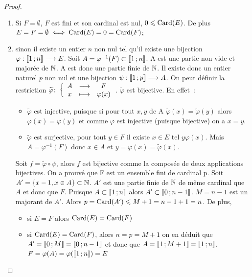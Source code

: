 \begin{proof}
  \begin{enumerate}
    \item Si \(F = \emptyset\), \(F\) est fini et son cardinal est nul, 
      \(0\leqslant\operatorname{Card}(E)\). De plus \(E = F = \emptyset \iff \operatorname{Card}(E) = 0 
      = \operatorname{Card}(F)\);
    \item sinon il existe un entier \(n\) non nul tel qu'il existe une 
      bijection \(\varphi:\mathopen{\llbracket}1\mathclose{}\mathpunct{};n\mathclose{\rrbracket} \longrightarrow E\). Soit 
      \(A = \varphi^{-1}(F) \subset\mathopen{\llbracket}1\mathclose{}\mathpunct{};n\mathclose{\rrbracket}\). A est une 
      partie non vide et majorée de \(\mathbb{N}\). A est donc une partie finie de 
      \(\mathbb{N}\).  Il existe donc un entier naturel \(p\) non nul et une 
      bijection \(\psi:\mathopen{\llbracket}1\mathclose{}\mathpunct{};p\mathclose{\rrbracket} \longrightarrow A\). On peut 
      définir la restriction 
      \(\widetilde{\varphi}\colon \left\{\begin{array}{ccc} A & \longrightarrow &F\\ x & \longmapsto & \varphi(x) \end{array} \right.\).  
      \(\widetilde{\varphi}\) est bijective. En effet~:
      \begin{itemize}
        \item \(\widetilde{\varphi}\) est injective, puisque si pour tout 
          \(x, y\) de A \(\widetilde{\varphi}(x) = \widetilde{\varphi}(y)\) 
          alors \(\varphi(x) = \varphi(y)\) et comme \(\varphi\) est 
          injective (puisque bijective) on a \(x = y\).
        \item \(\widetilde{\varphi}\) est surjective, pour tout \(y\in F\) 
          il existe \(x\in E\) tel \(y\varphi(x)\). Mais \(A = 
          \varphi^{-1}(F)\) donc \(x\in A\) et \(y = \varphi(x) = 
          \widetilde{\varphi}(x)\).
      \end{itemize}
      Soit \(f = \widetilde{\varphi}\circ \psi\), alors \(f\) est bijective 
      comme la composée de deux applications bijectives. On a prouvé que F 
      est un ensemble fini de cardinal p. Soit \(A' = \{x - 1, x\in 
      A\}\subset \mathbb{N}\). \(A'\) est une partie finie de \(\mathbb{N}\) de même 
      cardinal que \(A\) et donc que \(F\). Puisque 
      \(A\subset\mathopen{\llbracket}1\mathclose{}\mathpunct{};n\mathclose{\rrbracket}\) alors 
      \(A'\subset\mathopen{\llbracket}0\mathclose{}\mathpunct{};n - 1\mathclose{\rrbracket}\). \(M = n - 1\) est un 
      majorant de \(A'\). Alors \(p = \operatorname{Card}(A')\leqslant M + 1 = n - 1 + 1 = 
      n\). De plus, 
      \begin{itemize}
        \item si \(E = F\) alors \(\operatorname{Card}(E) = \operatorname{Card}(F)\)
        \item si \(\operatorname{Card}(E) = \operatorname{Card}(F)\), alors \(n = p = M + 1\) on en 
          déduit que \(A' = \mathopen{\llbracket}0\mathclose{}\mathpunct{};M\mathclose{\rrbracket} = \mathopen{\llbracket}0\mathclose{}\mathpunct{};n 
          - 1\mathclose{\rrbracket}\) et donc que \(A = \mathopen{\llbracket}1\mathclose{}\mathpunct{};M + 1\mathclose{\rrbracket} = 
          \mathopen{\llbracket}1\mathclose{}\mathpunct{};n\mathclose{\rrbracket}\).  \(F = \varphi(A) = 
          \varphi(\mathopen{\llbracket}1\mathclose{}\mathpunct{};n\mathclose{\rrbracket}) = E\)
      \end{itemize}
  \end{enumerate}
\end{proof}

